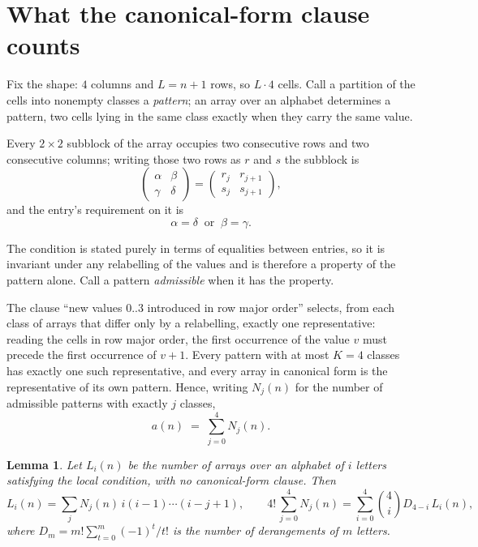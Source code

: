 \documentclass[11pt,a4paper]{article}
\theoremstyle{plain}
\newtheorem{lemma}[theorem]{Lemma}
\theoremstyle{definition}
\begin{document}
\section{What the canonical-form clause counts}

Fix the shape: $4$ columns and $L=n+1$ rows, so $L\cdot4$ cells. Call a
partition of the cells into nonempty classes a \emph{pattern}; an array over an alphabet
determines a pattern, two cells lying in the same class exactly when they carry the same
value.

Every $2\times2$ subblock of the array occupies two consecutive
rows and two consecutive columns; writing those two rows as $r$ and $s$ the
subblock is
\[
\begin{pmatrix}\alpha&\beta\\\gamma&\delta\end{pmatrix}=\begin{pmatrix}r_j&r_{j+1}\\s_j&s_{j+1}\end{pmatrix},
\]
and the entry's requirement on it is
\begin{equation}\label{eq:loc}
\alpha=\delta\ \text{ or }\ \beta=\gamma.
\end{equation}

The condition is stated purely in terms of equalities between entries, so it is invariant
under any relabelling of the values and is therefore a property of the pattern alone. Call a
pattern \emph{admissible} when it has the property.

The clause ``new values $0..3$ introduced in row major order'' selects, from each class
of arrays that differ only by a relabelling, exactly one representative: reading the cells in
row major order, the first occurrence of the value $v$ must precede the first occurrence of
$v+1$. Every pattern with at most $K=4$ classes has exactly one such representative, and
every array in canonical form is the representative of its own pattern. Hence, writing
$N_j(n)$ for the number of admissible patterns with exactly $j$ classes,
\begin{equation}\label{eq:apat}
a(n)\;=\;\sum_{j=0}^{4}N_j(n).
\end{equation}

\begin{lemma}\label{lem:inv}
Let $L_i(n)$ be the number of arrays over an alphabet of $i$ letters satisfying the local
condition, with no canonical-form clause. Then
\[
L_i(n)=\sum_j N_j(n)\,i(i-1)\cdots(i-j+1),
\qquad
4!\,\sum_{j=0}^{4}N_j(n)=\sum_{i=0}^{4}\binom{4}{i}D_{4-i}\,L_i(n),
\]
where $D_m=m!\sum_{t=0}^{m}(-1)^t/t!$ is the number of derangements of $m$ letters.
\end{lemma}
\end{document}
